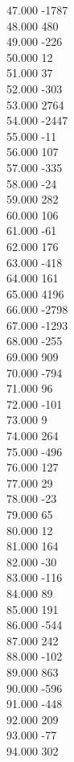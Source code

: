 { 47.000	-1787 \\
 48.000	480 \\
 49.000	-226 \\
 50.000	12 \\
 51.000	37 \\
 52.000	-303 \\
 53.000	2764 \\
 54.000	-2447 \\
 55.000	-11 \\
 56.000	107 \\
 57.000	-335 \\
 58.000	-24 \\
 59.000	282 \\
 60.000	106 \\
 61.000	-61 \\
 62.000	176 \\
 63.000	-418 \\
 64.000	161 \\
 65.000	4196 \\
 66.000	-2798 \\
 67.000	-1293 \\
 68.000	-255 \\
 69.000	909 \\
 70.000	-794 \\
 71.000	96 \\
 72.000	-101 \\
 73.000	9 \\
 74.000	264 \\
 75.000	-496 \\
 76.000	127 \\
 77.000	29 \\
 78.000	-23 \\
 79.000	65 \\
 80.000	12 \\
 81.000	164 \\
 82.000	-30 \\
 83.000	-116 \\
 84.000	89 \\
 85.000	191 \\
 86.000	-544 \\
 87.000	242 \\
 88.000	-102 \\
 89.000	863 \\
 90.000	-596 \\
 91.000	-448 \\
 92.000	209 \\
 93.000	-77 \\
 94.000	302 \\
}
